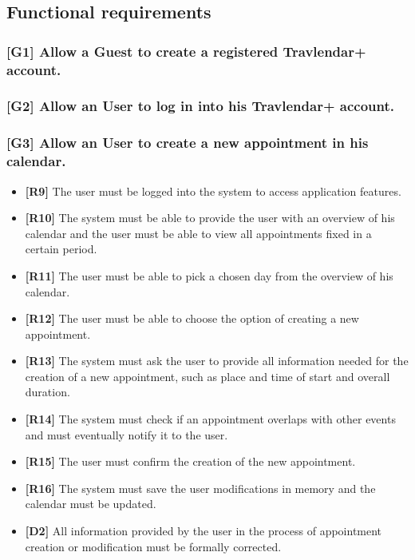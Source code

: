 \subsection{Functional requirements}
\subsubsection{[G1] Allow a Guest to create a registered Travlendar+ account.}
\subsubsection{[G2] Allow an User to log in into his Travlendar+ account.}
\subsubsection{[G3] Allow an User to create a new appointment in his calendar.}
	\begin{itemize}
		\item \textbf{[R9]} The user must be logged into the system to access application features.
		\item \textbf{[R10]} The system must be able to provide the user with an overview of his calendar and the user must be able to view all appointments fixed in a certain period.
		\item \textbf{[R11]} The user must be able to pick a chosen day from the overview of his calendar.
		\item \textbf{[R12]} The user must be able to choose the option of creating a new appointment.
		\item \textbf{[R13]} The system must ask the user to provide all information needed for the creation of a new appointment, such as place and time of start and overall duration.
		\item \textbf{[R14]} The system must check if an appointment overlaps with other events and must eventually notify it to the user.
		\item \textbf{[R15]} The user must confirm the creation of the new appointment.
		\item \textbf{[R16]} The system must save the user modifications in memory and the calendar must be updated.
		\item \textbf{[D2]} All information provided by the user in the process of appointment creation or modification must be formally corrected.
		
	\end{itemize}
